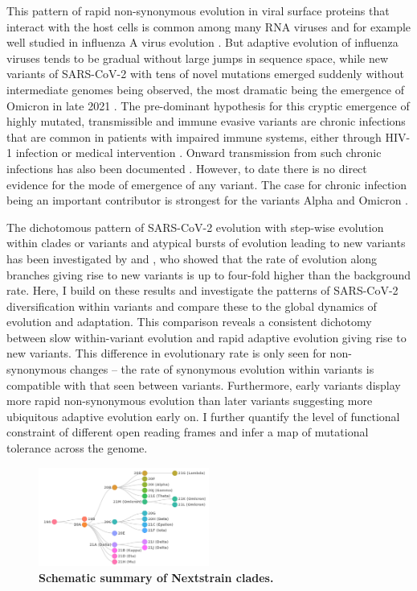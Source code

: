 \documentclass[aps,rmp, twocolumn]{revtex4}
\begin{document}
This pattern of rapid non-synonymous evolution in viral surface proteins that interact with the host cells is common among many RNA viruses and for example well studied in influenza A virus evolution \citep{bhatt_genomic_2011,strelkowa_clonal_2012}.
But adaptive evolution of influenza viruses tends to be gradual without large jumps in sequence space, while new variants of SARS-CoV-2 with tens of novel mutations emerged suddenly without intermediate genomes being observed, the most dramatic being the emergence of Omicron in late 2021 \citep{viana_rapid_2022}.
The pre-dominant hypothesis for this cryptic emergence of highly mutated, transmissible and immune evasive variants are chronic infections that are common in patients with impaired immune systems, either through HIV-1 infection \citep{cele_sars-cov-2_2022} or medical intervention \citep{choi_persistence_2020,kemp_sars-cov-2_2021}.
Onward transmission from such chronic infections has also been documented \citep{gonzalez-reiche_intrahost_2022}.
However, to date there is no direct evidence for the mode of emergence of any variant.
The case for chronic infection being an important contributor is strongest for the variants Alpha and Omicron \citep{hill_origins_2022}.

The dichotomous pattern of SARS-CoV-2 evolution with step-wise evolution within clades or variants and atypical bursts of evolution leading to new variants has been investigated by \citet{tay_emergence_2022} and \citet{hill_origins_2022}, who showed that the rate of evolution along branches giving rise to new variants is up to four-fold higher than the background rate.
Here, I build on these results and investigate the patterns of SARS-CoV-2 diversification within variants and compare these to the global dynamics of evolution and adaptation.
This comparison reveals a consistent dichotomy between slow within-variant evolution and rapid adaptive evolution giving rise to new variants.
This difference in evolutionary rate is only seen for non-synonymous changes -- the rate of synonymous evolution within variants is compatible with that seen between variants.
Furthermore, early variants display more rapid non-synonymous evolution than later variants suggesting more ubiquitous adaptive evolution early on.
I further quantify the level of functional constraint of different open reading frames and infer a map of mutational tolerance across the genome.

\begin{figure}
    \includegraphics[width=0.5\textwidth]{figures/clade_overview.png}
    \caption{{\bf Schematic summary of Nextstrain clades.}\label{fig:clade_overview}}
\end{figure}
\end{document}
